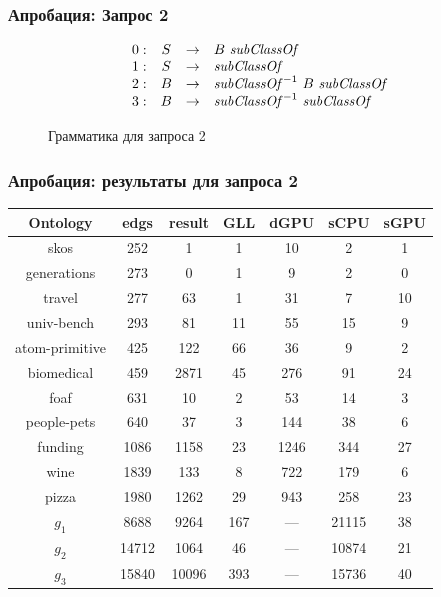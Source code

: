 \documentclass{beamer}
\begin{document}
\begin{frame}[fragile]
	\transwipe[direction=90]
	\frametitle{Апробация: Запрос 2}
\begin{figure}[h]
   \[
\begin{array}{rccl}
   0: & S & \rightarrow & B \ \text{\textit{subClassOf}} \\ 
   1: & S & \rightarrow & \text{\textit{subClassOf}} \\ 
   2: & B & \rightarrow & \text{\textit{subClassOf}}^{-1} \ B \ \text{\textit{subClassOf}} \\ 
   3: & B & \rightarrow & \text{\textit{subClassOf}}^{-1} \ \text{\textit{subClassOf}} \\ 
\end{array}
\]
\caption{Грамматика для запроса 2}
\label{ProductionRulesQuery2}
\end{figure}
\end{frame}


\begin{frame}[fragile]
  \transwipe[direction=90]
  \frametitle{Апробация: результаты для запроса 2}
\begin{center}
\begin{tabular}{ | c | c | c | c | c | c | c |}
\hline
Ontology & edgs & result & GLL & dGPU & sCPU & sGPU \\
\hline 
\hline
skos        & 252 & 1 & 1 & 10 & 2 & 1\\
generations & 273 & 0 & 1 & 9 & 2 & 0\\
travel      & 277 & 63 & 1 & 31 & 7 & 10\\
univ-bench  & 293 & 81 & 11 & 55 & 15 & 9\\
atom-primitive & 425 & 122 & 66 & 36 & 9 & 2\\biomedical & 459 & 2871 & 45 & 276 & 91 & 24\\
foaf        & 631 & 10 & 2 & 53 & 14 & 3\\
people-pets & 640 & 37 & 3 & 144 & 38 & 6\\
funding     & 1086 & 1158 & 23 & 1246 & 344 & 27\\
wine        & 1839 & 133 & 8 & 722 & 179 & 6\\
pizza       & 1980 & 1262 & 29 & 943 & 258 & 23\\
$g_{1}$     & 8688 & 9264 & 167 & --- & 21115 & 38\\
$g_{2}$     & 14712 & 1064 & 46 & --- & 10874 & 21\\
$g_{3}$     & 15840 & 10096 & 393 & --- & 15736 & 40\\
\hline
\end{tabular}

\end{center}
  
\end{frame}
\end{document}
